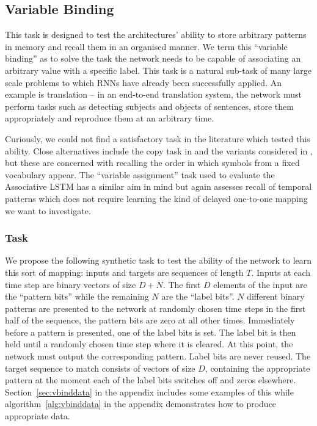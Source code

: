 \subsection{Variable Binding}
This task is designed to test the architectures' ability to store arbitrary patterns in memory and
recall them in an organised manner. We term this ``variable binding'' as to solve the task the network needs
to be capable of associating an arbitrary value with a specific label. This task is a natural
sub-task of many large scale problems to which RNNs have already been successfully applied.
An example is translation -- in an end-to-end translation system, the network must perform tasks such
as detecting subjects and objects of sentences, store them appropriately and reproduce them at an
arbitrary time.

Curiously, we could not find a satisfactory task in the literature which tested this ability.
Close alternatives include
the copy task in \autocite{Hochreiter1997} and the variants considered in \autocite{Graves2014}, but these
are concerned with recalling the order in which symbols from a fixed vocabulary appear. 
The ``variable assignment'' task
used to evaluate the Associative LSTM \autocite{Danihelka2016} has a similar aim in mind but again
assesses recall of temporal patterns which does not require learning the kind of delayed one-to-one
mapping we want to investigate.

\subsubsection{Task}
We propose the following synthetic task to test the ability of the network to learn this sort of
mapping: inputs and targets are sequences of length \(T\). Inputs at each time step are
binary vectors of size \(D+N\). The first \(D\) elements of the input are the ``pattern bits'' while
the remaining \(N\) are the ``label bits''. \(N\) different binary patterns are presented to the
network at randomly chosen time steps in the first half of the sequence, the pattern bits are zero at
all other times. Immediately before a pattern is presented, one of the label bits is set. The label
bit is then held until a randomly chosen time step where it is cleared.
At this point, the network must output the corresponding pattern. Label bits are never reused. The target
sequence to match consists of vectors of size \(D\), containing the appropriate pattern at the moment each
of the label bits switches off and zeros elsewhere. Section~\ref{sec:vbinddata} in the appendix includes
some examples of this
while algorithm~\ref{alg:vbinddata} in the appendix demonstrates how to produce appropriate data.

